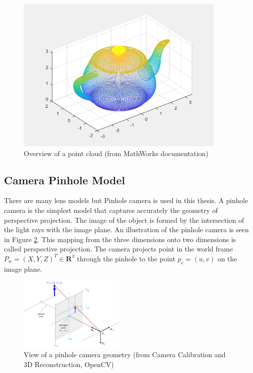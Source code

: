 \begin{figure}[!h]
\begin{center}
\includegraphics[width=4in]{figures02/pcd.png}
\caption{Overview of a point cloud (from MathWorks documentation)}%
\end{center}
\label{fig2:mypicture3}
\end{figure}


\subsection{ Camera Pinhole Model}\label{pinhole}
There are many lens models but Pinhole camera is used in this thesis. A pinhole camera is the simplest model that captures accurately the geometry of perspective projection. The image of the object is formed by the intersection of the light rays with the image plane. An illustration of the pinhole camera is seen in  Figure \ref{fig2:mypinhole}. This mapping from the three dimensions onto two dimensions is called perspective projection. The camera projects point in the world frame $ P_{w}=(X,Y,Z)^{T} \in \textbf{R}^{3}$ through the pinhole to  the point $p_{c}=(u,v)$ on the image plane.
 
\begin{figure}[!h]
\begin{center}
\includegraphics[width=2in]{figures02/pinhole_camera_model.png}
\caption{View of a pinhole camera geometry (from Camera Calibration and 3D Reconstruction, OpenCV)}%
\label{fig2:mypinhole}
\end{center}
\end{figure}

